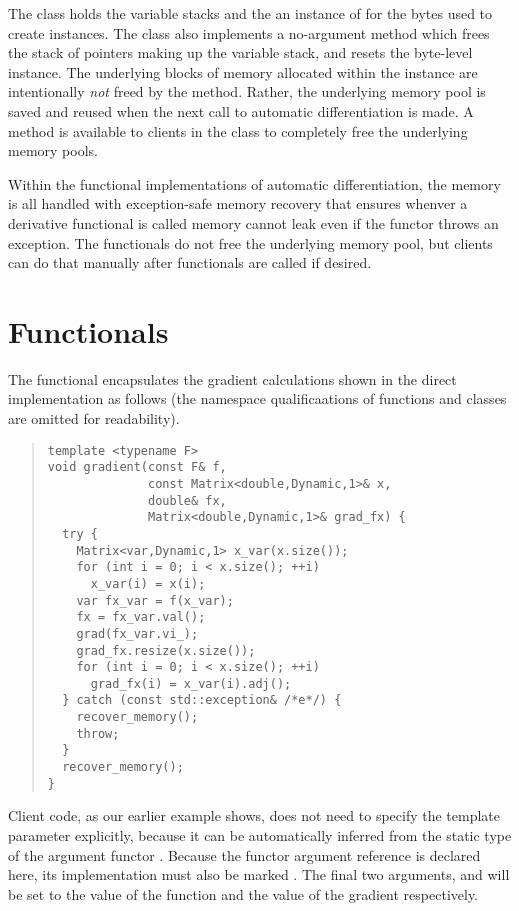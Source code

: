 \documentclass[10pt]{article}
\begin{document}
The  class holds the variable stacks and
the an instance of  for the bytes used to
create  instances.  The 
class also implements a no-argument  method
which frees the stack of pointers making up the variable stack, and
resets the byte-level  instance.  The underlying
blocks of memory allocated within the  instance are
intentionally \emph{not} freed by the  method.
Rather, the underlying memory pool is saved and reused when the next
call to automatic differentiation is made.  A method is available to
clients in the  class to completely free the
underlying memory pools.

Within the functional implementations of automatic differentiation,
the memory is all handled with exception-safe memory recovery that
ensures whenver a derivative functional is called memory cannot leak
even if the functor throws an exception.  The functionals do not free
the underlying memory pool, but clients can do that manually after
functionals are called if desired.


\section{Functionals}

The functional  encapsulates the gradient
calculations shown in the direct implementation as follows (the
namespace qualificaations of functions and classes are omitted for
readability).
%
\begin{quote}
\begin{Verbatim}
template <typename F> 
void gradient(const F& f,
              const Matrix<double,Dynamic,1>& x,
              double& fx,
              Matrix<double,Dynamic,1>& grad_fx) {
  try {
    Matrix<var,Dynamic,1> x_var(x.size());
    for (int i = 0; i < x.size(); ++i)
      x_var(i) = x(i);
    var fx_var = f(x_var);
    fx = fx_var.val();
    grad(fx_var.vi_);
    grad_fx.resize(x.size());
    for (int i = 0; i < x.size(); ++i)
      grad_fx(i) = x_var(i).adj();
  } catch (const std::exception& /*e*/) {
    recover_memory();
    throw;
  }
  recover_memory();
}
\end{Verbatim}
\end{quote}
%
Client code, as our earlier example shows, does not need to specify
the template parameter  explicitly, because it can be
automatically inferred from the static type of the argument functor
.  Because the functor argument reference is declared
 here, its  implementation must also be
marked .  The final two arguments,  and
 will be set to the value of the function and the value
of the gradient respectively.  
\end{document}
